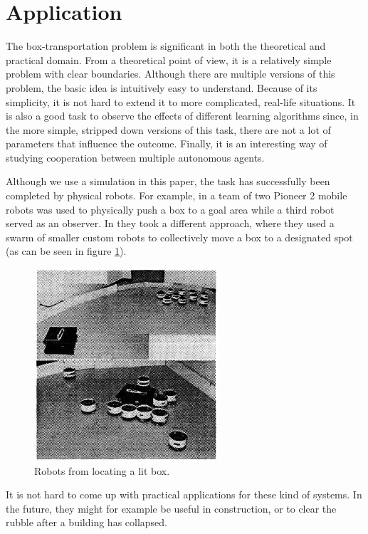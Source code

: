 \section{Application}
The box-transportation problem is significant in both the theoretical and practical domain. From a theoretical point of view, it is a relatively simple problem with clear boundaries. Although there are multiple versions of this problem, the basic idea is intuitively easy to understand. Because of its simplicity, it is not hard to extend it to more complicated, real-life situations. It is also a good task to observe the effects of different learning algorithms since, in the more simple, stripped down versions of this task, there are not a lot of parameters that influence the outcome. Finally, it is an interesting way of studying cooperation between multiple autonomous agents.

 Although we use a simulation in this paper, the task has successfully been completed by physical robots. For example, in \cite{mataric2002} a team of two Pioneer 2 mobile robots was used to physically push a box to a goal area while a third robot served as an observer. In \cite{kube1996} they took a different approach, where they used a swarm of smaller custom robots to collectively move a box to a designated spot (as can be seen in figure \ref{1}).
\begin{figure}
	\centering
	\includegraphics{images/swarmPushing.png}
	\caption{Robots from \cite{kube1996} locating a lit box.}
	\label{1}
\end{figure}
It is not hard to come up with practical applications for these kind of systems. In the future, they might for example be useful in construction, or to clear the rubble after a building has collapsed.\\
